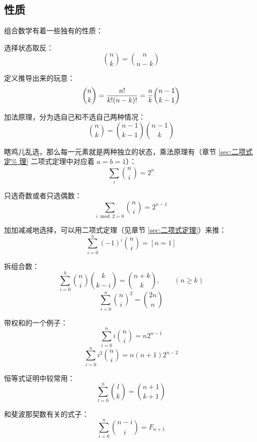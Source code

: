 \subsection{性质}
组合数学有着一些独有的性质：

选择状态取反：\[
    {n \choose k} = {n \choose n - k}
\]

定义推导出来的玩意：\[
    {n \choose k} = {n! \over k! (n - k)!} = {n \over k} {n - 1 \choose k - 1}
\]

加法原理，分为选自己和不选自己两种情况：\[
    {n \choose k} = {n - 1 \choose k - 1} {n - 1 \choose k}
\]

瞎鸡儿乱选，那么每一元素就是两种独立的状态，乘法原理有（章节 \ref{sec:二项式定%
理} 二项式定理中对应着 $a = b = 1$）：\[ \sum_{i} {n \choose i} = 2^n \]

只选奇数或者只选偶数：\[
    \sum_{i \bmod 2 = 0} {n \choose i} = 2^{n - 1}
\]

加加减减地选择，可以用二项式定理（见章节 \ref{sec:二项式定理}）来推：\[
    \sum^{n}_{i = 0} (-1)^i {n \choose i} = [n = 1]
\]

拆组合数：\[
    \sum_{i=0}^{k} {n \choose i} {k \choose k - i} = {n + k \choose k}, \qquad (n
    \ge k)
\] \[
    \sum_{i=0}^{n} {n \choose i}^2 = {2n \choose n}
\]

带权和的一个例子：\[
    \sum_{i=0}^{n} i{n \choose i} = n2^{n - 1}
\] \[
    \sum_{i=0}^{n} i^2{n \choose i} = n(n + 1)2^{n - 2}
\]

恒等式证明中较常用：\[
    \sum_{l=0}^{n} {l \choose k} = {n + 1 \choose k + 1}
\]

和斐波那契数有关的式子：\[
    \sum_{i = 0}^{n} {n - i \choose i} = F_{n + 1}
\]
